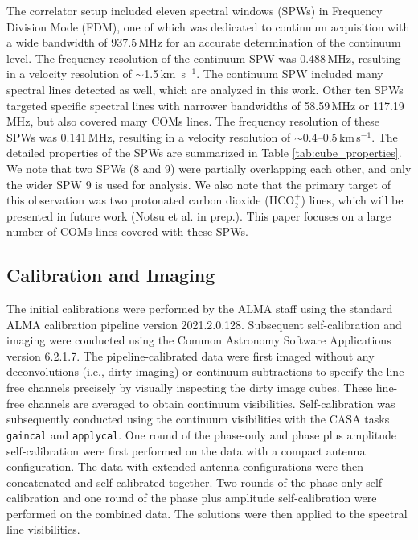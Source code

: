 \documentclass[linenumbers, twocolumn, times]{aastex631}
\newcommand{\hcotp}{HCO$_2^+$}
\begin{document}
The correlator setup included eleven spectral windows (SPWs) in Frequency Division Mode (FDM), one of which was dedicated to continuum acquisition with a wide bandwidth of 937.5\,MHz for an accurate determination of the continuum level. The frequency resolution of the continuum SPW was 0.488\,MHz, resulting in a velocity resolution of $\sim$1.5\,km \,s$^{-1}$. The continuum SPW included many spectral lines detected as well, which are analyzed in this work. Other ten SPWs targeted specific spectral lines with narrower bandwidths of 58.59\,MHz or 117.19\,MHz, but also covered many COMs lines. The frequency resolution of these SPWs was 0.141\,MHz, resulting in a velocity resolution of $\sim$0.4--0.5\,km\,s$^{-1}$. 
The detailed properties of the SPWs are summarized in Table \ref{tab:cube_properties}. We note that two SPWs (8 and 9) were partially overlapping each other, and only the wider SPW 9 is used for analysis. We also note that the primary target of this observation was two protonated carbon dioxide (\hcotp) lines, which will be presented in future work (Notsu et al. in prep.). This paper focuses on a large number of COMs lines covered with these SPWs.


\subsection{Calibration and Imaging}
The initial calibrations were performed by the ALMA staff using the standard ALMA calibration pipeline version 2021.2.0.128. Subsequent self-calibration and imaging were conducted using the Common Astronomy Software Applications \citep[CASA;][]{CASA} version 6.2.1.7. The pipeline-calibrated data were first imaged without any deconvolutions (i.e., dirty imaging) or continuum-subtractions to specify the line-free channels precisely by visually inspecting the dirty image cubes. These line-free channels are averaged to obtain continuum visibilities. Self-calibration was subsequently conducted using the continuum visibilities with the CASA tasks \texttt{gaincal} and \texttt{applycal}. One round of the phase-only and phase plus amplitude self-calibration were first performed on the data with a compact antenna configuration. The data with extended antenna configurations were then concatenated and self-calibrated together. Two rounds of the phase-only self-calibration and one round of the phase plus amplitude self-calibration were performed on the combined data. The solutions were then applied to the spectral line visibilities.
\end{document}
